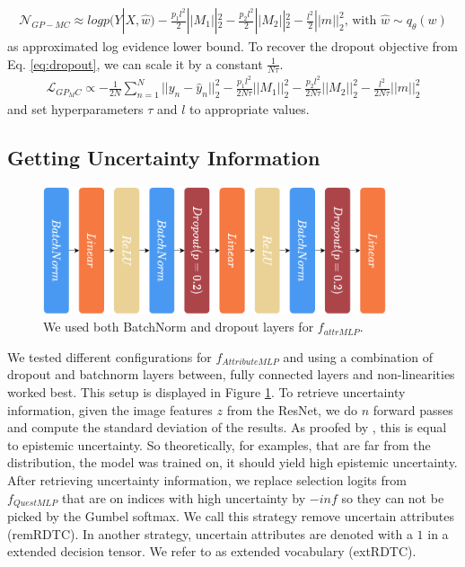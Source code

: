 \documentclass[a4paper,cleardoubleempty,BCOR1cm, 11pt]{report}
\begin{document}
\begin{align*}
\mathcal{N}_{GP-MC} \approx log p(Y|X, \hat{w}) - \frac{p_1 l^2}{2} ||M_1||^2_2 - \frac{p_2 l^2}{2}||M_2||^2_2 - \frac{l^2}{2}||m||^2_2 \text{, with } \hat{w} \sim q_{\theta}(w)
\end{align*}
as approximated log evidence lower bound.
To recover the dropout objective from Eq. \ref{eq:dropout}, we can scale it by a constant $\frac{1}{N \tau}$.
\begin{align*}
\mathcal{L}_{GP_MC} \propto  - \frac{1}{2N} \sum_{n=1}^N ||y_n - \hat{y}_n||^2_2 -  \frac{p_1 l^2}{2N\tau} ||M_1||^2_2 - \frac{p_2 l^2}{2N\tau}||M_2||^2_2 - \frac{l^2}{2N\tau}||m||^2_2
\end{align*}
and set hyperparameters $\tau$ and $l$ to appropriate values.


\subsection{Getting Uncertainty Information}
\begin{figure}
	\centering
	\includegraphics[width=0.9\textwidth]{images/f_attrMLP.pdf} 
	\caption{We used both BatchNorm and dropout layers for $f_{attrMLP}$.}
	\label{fig:f_attrMLP}
\end{figure}
We tested different configurations for $f_{AttributeMLP}$ and using a combination of dropout and batchnorm layers between, fully connected layers and non-linearities worked best. This setup is displayed in Figure \ref{fig:f_attrMLP}. To retrieve uncertainty information, given the image features $z$ from the ResNet, we do $n$ forward passes and compute the standard deviation of the results. As proofed by \citet{gal2016dropout}, this is equal to epistemic uncertainty. So theoretically, for examples, that are far from the distribution, the model was trained on, it should yield high epistemic uncertainty. 
After retrieving uncertainty information, we replace selection logits from $f_{QuestMLP}$ that are on indices with high uncertainty by $-inf$ so they can not be picked by the Gumbel softmax. We call this strategy remove uncertain attributes (remRDTC). In another strategy, uncertain attributes are denoted with a $1$ in a extended decision tensor. We refer to  as extended vocabulary (extRDTC).
\end{document}
